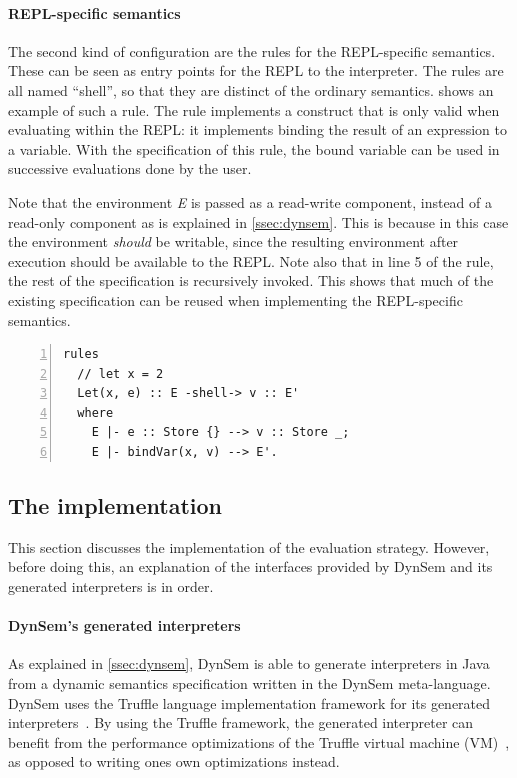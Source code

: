 \paragraph{REPL-specific semantics} The second kind of configuration are the
rules for the REPL-specific semantics. These can be seen as entry points for the
REPL to the interpreter. The rules are all named ``shell'', so that they are
distinct of the ordinary semantics.  shows an example of
such a rule. The rule implements a construct that is only valid when evaluating
within the REPL: it implements binding the result of an expression to a
variable. With the specification of this rule, the bound variable can be used in
successive evaluations done by the user.

Note that the environment \textit{E} is passed as a read-write component,
instead of a read-only component as is explained in \cref{ssec:dynsem}. This is
because in this case the environment \emph{should} be writable, since the
resulting environment after execution should be available to the REPL. Note also
that in line 5 of the rule, the rest of the specification is recursively
invoked. This shows that much of the existing specification can be reused when
implementing the REPL-specific semantics.

\begin{minipage}{\textwidth}
\begin{lstlisting}[language=dynsem,caption={A rule specifying semantics specific
to the REPL.},label={lst:shell-rule},numbers=left]
rules
  // let x = 2
  Let(x, e) :: E -shell-> v :: E'
  where
    E |- e :: Store {} --> v :: Store _;
    E |- bindVar(x, v) --> E'.
\end{lstlisting}
\end{minipage}

\subsection{The implementation}
\label{ssec:implementation}
This section discusses the implementation of the evaluation
strategy. However, before doing this, an explanation of the interfaces provided
by DynSem and its generated interpreters is in order.

\paragraph{DynSem's generated interpreters} As explained in \cref{ssec:dynsem},
DynSem is able to generate interpreters in Java from a dynamic semantics
specification written in the DynSem meta-language. DynSem uses the Truffle
language implementation framework for its generated
interpreters~\cite{Humer14}. By using the Truffle framework, the generated
interpreter can benefit from the performance optimizations of the Truffle
virtual machine (VM)~\cite{Wurthinger13}, as opposed to writing ones own
optimizations instead.

